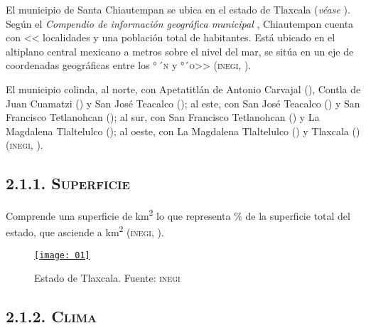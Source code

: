 \documentclass[14pt,letterpaper,twoside]{extbook} %
\begin{document}
\noindent El municipio de Santa Chiautempan se ubica en el estado de Tlaxcala (\emph{véase} ). Según el \textit{Compendio de información geográfica municipal} , Chiautempan cuenta con << localidades y una población total de  habitantes. Está ubicado en el altiplano central mexicano a  metros sobre el nivel del mar, se sitúa en un eje de coordenadas geográficas entre los °\,\'\ \textsc{n} y °\thinspace{}\' \ \textsc{o}>> (\textsc{inegi}, ).

El municipio colinda, al norte, con Apetatitlán de Antonio Carvajal (), Contla de Juan Cuamatzi () y San José Teacalco (); al este, con San José Teacalco () y San Francisco Tetlanohcan (); al sur, con San Francisco Tetlanohcan () y La Magdalena Tlaltelulco (); al oeste, con La Magdalena Tlaltelulco () y Tlaxcala () (\textsc{inegi}, ).

\subsection*{\mdseries\large\textsc{2.1.1. Superficie}}

\noindent Comprende una superficie de \thinspace km\textsuperscript{2} lo que representa \% de la superficie total del estado, que asciende a \thinspace km\textsuperscript{2} (\textsc{inegi}, ).

\begin{figure}
\begin{center}
\renewcommand{\figurename}{Imagen}
\href{http://cuentame.inegi.org.mx/mapas/pdf/entidades/div_municipal/tlxmpios.pdf}{\texttt{[image: 01]}}
\caption[Estado de Tlaxcala]{Estado de Tlaxcala. Fuente: \textsc{inegi}}
\label{chiautempan}
\end{center}
\end{figure}

\subsection*{\mdseries\large\textsc{2.1.2. Clima}}
\end{document}
